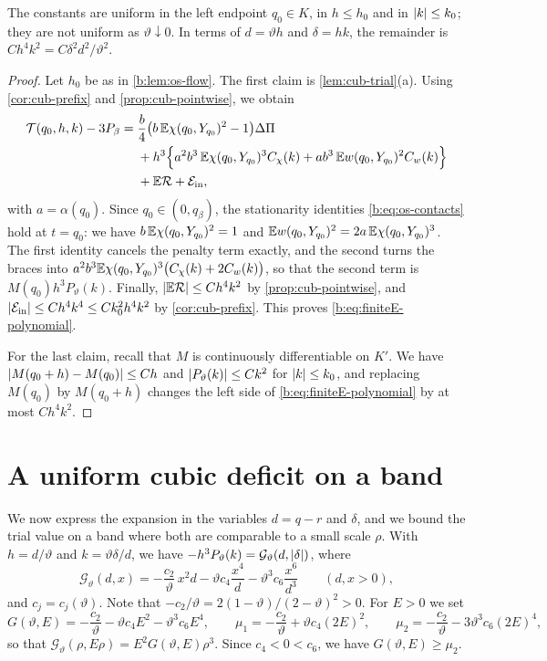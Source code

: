 The constants are uniform in the left endpoint $q_0\in K$, in $h\le h_0$ and
in $\lvert k\rvert\le k_0$; they are not uniform as $\vartheta\downarrow0$. In terms of
$d=\vartheta h$ and $\delta=hk$, the remainder is $Ch^4k^2=C\delta^2d^2/\vartheta^2$.

\begin{proof}
Let $h_0$ be as in \cref{b:lem:os-flow}. The first claim is
\cref{lem:cub-trial}(a). Using \cref{cor:cub-prefix} and
\cref{prop:cub-pointwise}, we obtain
\[
\begin{aligned}
 \mathcal T(q_0,h,k)-3P_\beta={}&\frac b4\bigl(b\,\mathbb E\chi(q_0,Y_{q_0})^2-1\bigr)\Delta\Pi\\
 &+h^3\Bigl\{a^2b^3\,\mathbb E\chi(q_0,Y_{q_0})^3C_\chi(k)+ab^3\,\mathbb E w(q_0,Y_{q_0})^2C_w(k)\Bigr\}\\
 &+\mathbb E\mathcal R+\mathcal E_{\rm in},
\end{aligned}
\]
with $a=\alpha(q_0)$. Since $q_0\in(0,q_\beta)$, the stationarity identities
\eqref{b:eq:os-contacts} hold at $t=q_0$: we have $b\,\mathbb E\chi(q_0,Y_{q_0})^2=1$ and
$\mathbb E w(q_0,Y_{q_0})^2=2a\,\mathbb E\chi(q_0,Y_{q_0})^3$. The first identity cancels the
penalty term exactly, and the second turns the braces into
$a^2b^3\mathbb E\chi(q_0,Y_{q_0})^3\bigl(C_\chi(k)+2C_w(k)\bigr)$, so that the second
term is $M(q_0)h^3P_\vartheta(k)$. Finally, $\lvert \mathbb E\mathcal R\rvert\le Ch^4k^2$ by
\cref{prop:cub-pointwise}, and $\lvert \mathcal E_{\rm in}\rvert\le Ch^4k^4\le
Ck_0^2h^4k^2$ by \cref{cor:cub-prefix}. This proves
\eqref{b:eq:finiteE-polynomial}.

For the last claim, recall that $M$ is continuously differentiable on $K'$. We
have $\lvert M(q_0+h)-M(q_0)\rvert\le Ch$ and $\lvert P_\vartheta(k)\rvert\le Ck^2$ for $\lvert k\rvert\le k_0$, and replacing $M(q_0)$ by $M(q_0+h)$ changes the left side of
\eqref{b:eq:finiteE-polynomial} by at most $Ch^4k^2$.
\end{proof}

\section{A uniform cubic deficit on a band}\label{sec:cub-band}

We now express the expansion in the variables $d=q-r$ and $\delta$, and we bound
the trial value on a band where both are comparable to a small scale $\rho$.
With $h=d/\vartheta$ and $k=\vartheta\delta/d$, we have
$-h^3P_\vartheta(k)=\mathcal G_\vartheta(d,\lvert \delta\rvert)$, where
\begin{equation}\label{eq:cub-G-function}
 \mathcal G_\vartheta(d,x)=-\frac{c_2}\vartheta\,x^2d-\vartheta c_4\frac{x^4}d
 -\vartheta^3c_6\frac{x^6}{d^3}\qquad(d,x>0),
\end{equation}
and $c_j=c_j(\vartheta)$. Note that
$-c_2/\vartheta=2(1-\vartheta)/(2-\vartheta)^2>0$. For $E>0$ we set
\[
 G(\vartheta,E)=-\frac{c_2}\vartheta-\vartheta c_4E^2-\vartheta^3c_6E^4,
 \qquad
 \mu_1=-\frac{c_2}\vartheta+\vartheta c_4(2E)^2,\qquad
 \mu_2=-\frac{c_2}\vartheta-3\vartheta^3c_6(2E)^4,
\]
so that $\mathcal G_\vartheta(\rho,E\rho)=E^2G(\vartheta,E)\rho^3$. Since
$c_4<0<c_6$, we have $G(\vartheta,E)\ge\mu_2$.

